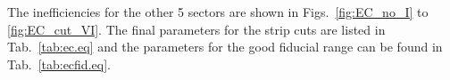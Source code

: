 %
%
%
%
%
%
%
%

\FloatBarrier
The inefficiencies for the other 5 sectors are shown in Figs.~\ref{fig:EC_no_I} to \ref{fig:EC_cut_VI}. The final parameters for the  strip cuts are listed in Tab.~\ref{tab:ec.eq} and the parameters for the good  fiducial range can be found in Tab.~\ref{tab:ecfid.eq}.



